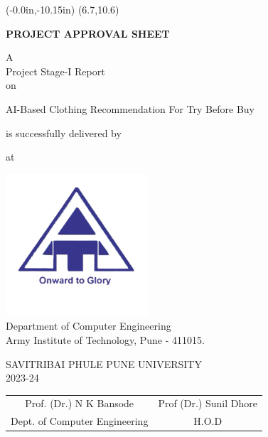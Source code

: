 \thisfancyput(-0.0in,-10.15in){
	\setlength{\unitlength}{1in}
	\framebox(6.7,10.6)
}
\setlength{\parindent}{0mm}
\begin{center}
	\vspace*{0.5 \baselineskip}

	{
		\bfseries
		PROJECT APPROVAL SHEET
		\vspace*{1.5 \baselineskip}
	}
		
	A \\ Project Stage-I Report \\ on
	\vspace*{1.5 \baselineskip}

	AI-Based Clothing Recommendation For Try Before Buy \\
	\vspace*{1.5\baselineskip}

	is successfully delivered by
	
	\vspace*{\baselineskip}

	\nametable
	
	\vspace*{\baselineskip}
	
	at

	\vspace*{\baselineskip}

	\includegraphics[scale=0.75]{components/images/logo.png} \\[0.5cm]
	
	Department of Computer Engineering \\
	Army Institute of Technology, Pune - 411015.\\
	\vspace*{0.5\baselineskip}
	
	SAVITRIBAI PHULE PUNE UNIVERSITY \\
	2023-24
\end{center}

\vspace*{3\baselineskip}

\begin{table}[h!]
	\centering
	\begin{tabular}{ c c }
		Prof. (Dr.) N K Bansode \hspace{35mm} & Prof (Dr.) Sunil Dhore \\
		Dept. of Computer Engineering \hspace{35mm} & H.O.D
	\end{tabular}
\end{table}

\pagebreak